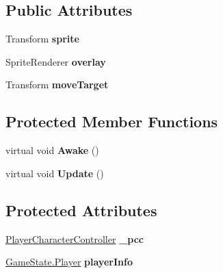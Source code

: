 \subsection*{Public Attributes}
\begin{DoxyCompactItemize}
\item 
\hypertarget{class_player_reference_a32979ccda155fe50f781e80c8bcfc5bd}{Transform {\bfseries sprite}}\label{class_player_reference_a32979ccda155fe50f781e80c8bcfc5bd}

\item 
\hypertarget{class_player_reference_a46a995f93fe98882b1a79d57b0baa66b}{Sprite\-Renderer {\bfseries overlay}}\label{class_player_reference_a46a995f93fe98882b1a79d57b0baa66b}

\item 
\hypertarget{class_player_reference_accd3ff8958657fee1e45aeb824b3e8e2}{Transform {\bfseries move\-Target}}\label{class_player_reference_accd3ff8958657fee1e45aeb824b3e8e2}

\end{DoxyCompactItemize}
\subsection*{Protected Member Functions}
\begin{DoxyCompactItemize}
\item 
\hypertarget{class_player_reference_adce9feacb370df0b0ea95754376aec04}{virtual void {\bfseries Awake} ()}\label{class_player_reference_adce9feacb370df0b0ea95754376aec04}

\item 
\hypertarget{class_player_reference_ad75981d8a0e56d56370a27b9fcca1e91}{virtual void {\bfseries Update} ()}\label{class_player_reference_ad75981d8a0e56d56370a27b9fcca1e91}

\end{DoxyCompactItemize}
\subsection*{Protected Attributes}
\begin{DoxyCompactItemize}
\item 
\hypertarget{class_player_reference_ae076e8379386c67d01beb3d76c3b4600}{\hyperlink{class_player_character_controller}{Player\-Character\-Controller} {\bfseries \-\_\-pcc}}\label{class_player_reference_ae076e8379386c67d01beb3d76c3b4600}

\item 
\hypertarget{class_player_reference_abffbcb7165e1d2fbb37b536d87eca369}{\hyperlink{struct_game_state_1_1_player}{Game\-State.\-Player} {\bfseries player\-Info}}\label{class_player_reference_abffbcb7165e1d2fbb37b536d87eca369}

\end{DoxyCompactItemize}
